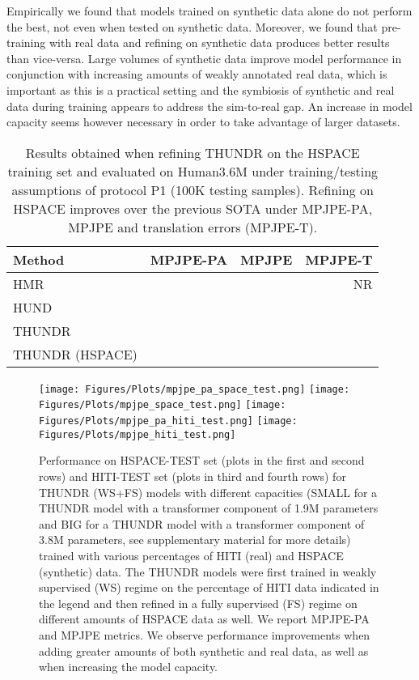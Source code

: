 \documentclass[10pt,twocolumn,letterpaper]{article}
\begin{document}
Empirically we found that models trained on synthetic data alone do not perform the best, not even when tested on synthetic data. Moreover, we found that pre-training with real data and refining on synthetic data produces better results than vice-versa. 
Large volumes of synthetic data improve model performance in conjunction with increasing amounts of weakly annotated real data, which is important as this is a practical setting and the symbiosis of synthetic and real data during training appears to address the sim-to-real gap. An increase in model capacity seems however necessary in order to take advantage of larger datasets. 

\begin{table}[!htbp]
    \small
    \centering
    \begin{tabular}[t]{|l||r|r|r|}
    \hline
    \textbf{Method}  & {MPJPE-PA} & {MPJPE} & {MPJPE-T} \\ 
    \hline
    \hline
    HMR \cite{Kanazawa2018} &  & & NR \\
    \hline
    HUND \cite{zanfir2020neural} &  & &  \\
    \hline
    THUNDR \cite{Zanfir_2021_ICCV} &  &  &  \\
    \hline
    \hline
    THUNDR (HSPACE) &  &  &  \\
    \hline
    \end{tabular}
    \caption{\small Results obtained when refining THUNDR \cite{Zanfir_2021_ICCV} on the HSPACE training set and evaluated on Human3.6M under training/testing assumptions of protocol P1 (100K testing samples). Refining on HSPACE improves over the previous SOTA under MPJPE-PA, MPJPE and translation errors (MPJPE-T).}
\label{tbl:H36MP1}
\end{table}


\begin{figure*}[!htbp]
\begin{center}
    \texttt{[image: Figures/Plots/mpjpe\_pa\_space\_test.png]}
    \texttt{[image: Figures/Plots/mpjpe\_space\_test.png]}   
    \texttt{[image: Figures/Plots/mpjpe\_pa\_hiti\_test.png]}
    \texttt{[image: Figures/Plots/mpjpe\_hiti\_test.png]}   
\end{center}
\caption{\small Performance on HSPACE-TEST set (plots in the first and second rows) and HITI-TEST set (plots in third and fourth rows) for THUNDR (WS+FS) models with different capacities (SMALL for a THUNDR model with a transformer component of 1.9M parameters and BIG for a THUNDR model with a transformer component of 3.8M parameters, see supplementary material for more details) trained with various percentages of HITI (real) and HSPACE (synthetic) data. The THUNDR models were first trained in weakly supervised (WS) regime on the percentage of HITI data indicated in the legend and then refined in a fully supervised (FS) regime on different amounts of HSPACE data as well. We report MPJPE-PA and MPJPE metrics. We observe performance improvements when adding greater amounts of both synthetic and real data, as well as when increasing the model capacity.}
\label{fig:thundr_ws_fs_ablations}
\end{figure*}
\end{document}
